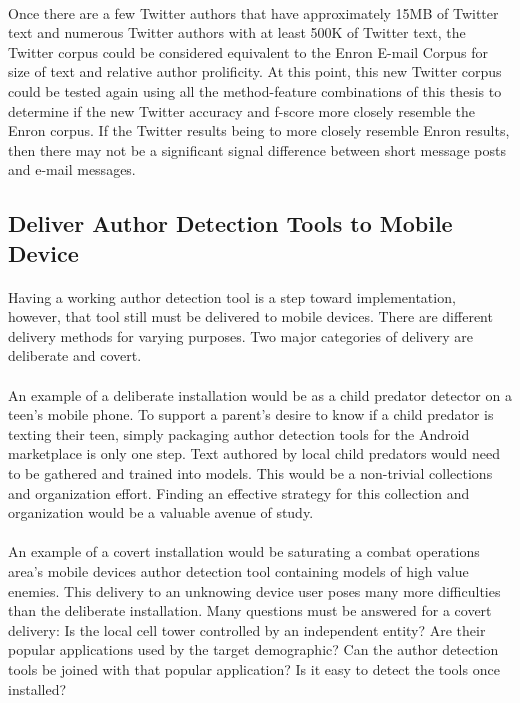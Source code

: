 	\paragraph*{} Once there are a few Twitter authors that have approximately 15MB of Twitter text and numerous Twitter authors with at least 500K of Twitter text, the Twitter corpus could be considered equivalent to the Enron E-mail Corpus for size of text and relative author prolificity.  At this point, this new Twitter corpus could be tested again using all the method-feature combinations of this thesis to determine if the new Twitter accuracy and f-score more closely resemble the Enron corpus.  If the Twitter results being to more closely resemble Enron results, then there may not be a significant signal difference between short message posts and e-mail messages.

\subsection{Deliver Author Detection Tools to Mobile Device}
	\paragraph*{} Having a working author detection tool is a step toward implementation, however, that tool still must be delivered to mobile devices.  There are different delivery methods for varying purposes.  Two major categories of delivery are deliberate and covert.
	\paragraph*{}An example of a deliberate installation would be as a child predator detector on a teen's mobile phone. To support a parent's desire to know if a child predator is texting their teen, simply packaging author detection tools for the Android marketplace is only one step.  Text authored by local child predators would need to be gathered and trained into models.  This would be a non-trivial collections and organization effort. Finding an effective strategy for this collection and organization would be a valuable avenue of study.
	\paragraph*{} An example of a covert installation would be saturating a combat operations area's mobile devices author detection tool containing models of high value enemies. This delivery to an unknowing device user poses many more difficulties than the deliberate installation. Many questions must be answered for a covert delivery:  Is the local cell tower controlled by an independent entity?  Are their popular applications used by the target demographic?  Can the author detection tools be joined with that popular application?  Is it easy to detect the tools once installed?
